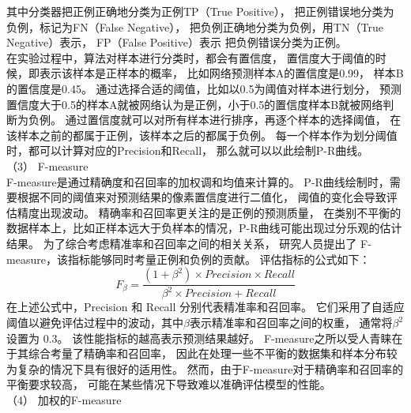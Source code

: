 %
%
其中分类器把正例正确地分类为正例TP（True Positive），
把正例错误地分类为负例，标记为FN（False Negative），
把负例正确地分类为负例，用TN（True Negative）表示，
FP（False Positive）表示
把负例错误分类为正例。
\\
%
%
%
%
\indent
在实验过程中，算法对样本进行分类时，都会有置信度，
置信度大于阈值的时候，即表示该样本是正样本的概率，
比如网络预测样本A的置信度是0.99，
样本B的置信度是0.45。
通过选择合适的阈值，比如以0.5为阈值对样本进行划分，
预测置信度大于0.5的样本A就被网络认为是正例，小于0.5的置信度样本B就被网络判断为负例。
通过置信度就可以对所有样本进行排序，再逐个样本的选择阈值，
在该样本之前的都属于正例，该样本之后的都属于负例。
每一个样本作为划分阈值时，都可以计算对应的Precision和Recall，
那么就可以以此绘制P-R曲线。
\\
%
%
%
%
\indent
（3）
F-measure
\\
%
%
%
%
\indent
F-measure是通过精确度和召回率的加权调和均值来计算的。
P-R曲线绘制时，需要根据不同的阈值来对预测结果的像素置信度进行二值化，
阈值的变化会导致评估精度出现波动。
精确率和召回率更关注的是正例的预测质量，
在类别不平衡的数据样本上，比如正样本远大于负样本的情况，P-R曲线可能出现过分乐观的估计结果。
为了综合考虑精准率和召回率之间的相关关系，
研究人员提出了 F-measure，该指标能够同时考量正例和负例的贡献。
评估指标的公式如下：
%
%
\begin{equation}
	F_{\beta} = \frac{\left ( 1 + \beta^{2} \right ) \times Precision \times Recall }{\beta^{2} \times Precision + Recall } 
\end{equation}
%
%
在上述公式中，Precision 和 Recall 分别代表精准率和召回率。
它们采用了自适应阈值以避免评估过程中的波动，其中$\beta$表示精准率和召回率之间的权重，
通常将$\beta^{2}$设置为 0.3。
该性能指标的越高表示预测结果越好。
F-measure之所以受人青睐在于其综合考量了精确率和召回率，
因此在处理一些不平衡的数据集和样本分布较为复杂的情况下具有很好的适用性。
然而，由于F-measure对于精确率和召回率的平衡要求较高，
可能在某些情况下导致难以准确评估模型的性能。
\\
%
%
%
%
\indent
（4）
加权的F-measure
\\
